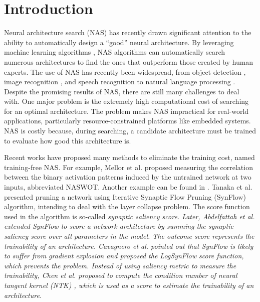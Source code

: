 \documentclass[sigconf]{acmart}
\begin{document}
\section{Introduction}
\label{sec:introduction}

    Neural architecture search (NAS) has recently drawn significant attention 
    to the ability to automatically design a ``good'' neural architecture. 
    By leveraging machine learning algorithms 
    \cite{https://doi.org/10.48550/arxiv.1611.01578}, NAS algorithms can 
    automatically search numerous architectures to find the ones 
    that outperform those created by human experts. The use of NAS has recently been widespread, 
    from object detection \cite{https://doi.org/10.48550/arxiv.2111.13336}, 
    image recognition \cite{https://doi.org/10.48550/arxiv.2006.04647},  
    and speech recognition \cite{https://doi.org/10.48550/arxiv.2011.05649} 
    to natural language processing \cite{jiang-etal-2019-improved}. 
    Despite the promising results of NAS, there are still many challenges 
    to deal with. One major problem is the extremely high computational 
    cost of searching for an optimal architecture. The problem makes NAS 
    impractical for real-world applications, particularly resource-constrained 
    platforms like embedded systems. NAS is costly because, 
    during searching, a candidate architecture must be trained to 
    evaluate how good this architecture is. 

    Recent works have proposed many methods to eliminate the training cost, 
    named training-free NAS. 
    For example, Mellor et al. \cite{https://doi.org/10.48550/arxiv.2006.04647} 
    proposed measuring the correlation between the binary 
    activation patterns induced by the untrained network at two inputs, 
    abbreviated NASWOT. 
	Another example can be found in \cite{tanaka2020pruning}. Tanaka et al. 
    presented pruning a network using Iterative Synaptic Flow Pruning 
    (SynFlow) algorithm, intending to deal with the layer collapse 
    problem. The score function used in the algorithm is so-called 
    \it{synaptic saliency} \rm{score}. Later, Abdelfattah et al. 
    \cite{abdelfattah2021zerocost} extended SynFlow to score a network 
    architecture by summing the synaptic saliency score over all parameters 
    in the model. The outcome score represents the trainability of an 
    architecture. Cavagnero et al. \cite{Cavagnero_2023} pointed out that 
    SynFlow is likely to suffer from gradient explosion and proposed 
    the LogSynFlow score function, which prevents the problem. 
    Instead of using saliency metric to measure the trainability, Chen et al. 
    \cite{https://doi.org/10.48550/arxiv.2102.11535} proposed to compute 
    the condition number of neural tangent kernel (NTK) 
    \cite{https://doi.org/10.48550/arxiv.2109.00817}, which is used as 
    a score to estimate the trainability of an architecture. 
\end{document}
